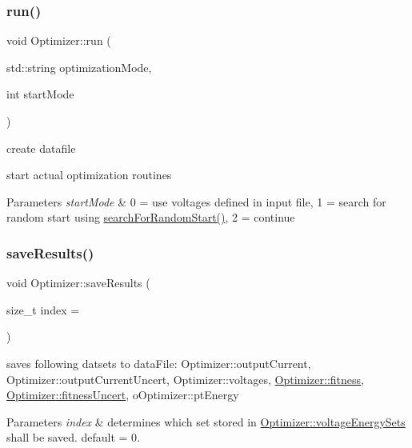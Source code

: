 \subsubsection{\texorpdfstring{run()}{run()}}
{\footnotesize\ttfamily void Optimizer\+::run (\begin{DoxyParamCaption}\item[{std\+::string}]{optimization\+Mode,  }\item[{int}]{start\+Mode }\end{DoxyParamCaption})}


\begin{DoxyItemize}
\item create datafile
\item start actual optimization routines 
\begin{DoxyParams}{Parameters}
{\em start\+Mode} & 0 = use voltages defined in input file, 1 = search for random start using \hyperlink{classOptimizer_a5dfd9a3a649ffa7e064c49d00afdb384}{search\+For\+Random\+Start()}, 2 = continue \\
\hline
\end{DoxyParams}

\end{DoxyItemize}\mbox{\label{classOptimizer_a67407e1db0c02fa16ac4c6438dcd0e74}} 
\subsubsection{\texorpdfstring{save\+Results()}{saveResults()}}
{\footnotesize\ttfamily void Optimizer\+::save\+Results (\begin{DoxyParamCaption}\item[{size\+\_\+t}]{index = {} }\end{DoxyParamCaption})\hspace{0.3cm}{\ttfamily [private]}}

saves following datsets to data\+File\+: Optimizer\+::output\+Current, Optimizer\+::output\+Current\+Uncert, Optimizer\+::voltages, \hyperlink{classOptimizer_a81991596f83ec6ded5c3b45545cde3cd}{Optimizer\+::fitness}, \hyperlink{classOptimizer_a43a00ff6308575ffdea61f31b5c8bda0}{Optimizer\+::fitness\+Uncert}, o\+Optimizer\+::pt\+Energy 
\begin{DoxyParams}{Parameters}
{\em index} & determines which set stored in \hyperlink{classOptimizer_ac4668dd4b83b15cb877daa134f55e5e2}{Optimizer\+::voltage\+Energy\+Sets} shall be saved. default = 0. \\
\hline
\end{DoxyParams}
\mbox{\label{classOptimizer_a5dfd9a3a649ffa7e064c49d00afdb384}} 
